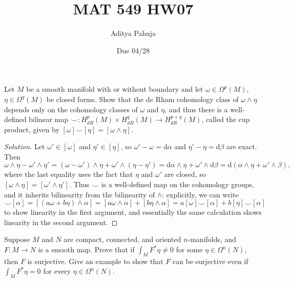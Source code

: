 \documentclass[10pt]{article}
\title{MAT 549 HW07}
\author{\large Aditya Pahuja}
\date{\large Due 04/28}
\newcommand{\dd}{\mathrm{d}}
\newenvironment{soln}{\begin{proof}[Solution]}{\end{proof}}
\begin{document}
\maketitle

\begin{problem}
    [17-1]
    Let $M$ be a smooth manifold with or without boundary
    and let $\omega\in\Omega^p(M)$, $\eta\in\Omega^q(M)$
    be closed forms. Show that the de Rham cohomology class
    of $\omega\wedge\eta$ depends only on
    the cohomology classes of $\omega$ and $\eta$,
    and thus there is a well-defined bilinear map
    $\smile\colon H^p_{dR}(M)\times H^q_{dR}(M)\to H^{p+q}_{dR}(M)$,
    called the cup product, given by
    $[\omega]\smile[\eta] = [\omega\wedge\eta]$.
\end{problem}

\begin{soln}
    Let $\omega'\in[\omega]$ and $\eta'\in[\eta]$,
    so $\omega' - \omega = \dd\alpha$ and $\eta' - \eta = \dd\beta$ are exact.
    Then
    \begin{equation*}
	\omega\wedge\eta - \omega'\wedge\eta'
	= (\omega - \omega')\wedge\eta
	+ \omega'\wedge(\eta - \eta')
	= \dd\alpha\wedge\eta + \omega'\wedge\dd\beta
	= \dd(\alpha\wedge\eta + \omega'\wedge\beta),
    \end{equation*}
    where the last equality uses the fact that
    $\eta$ and $\omega'$ are closed, so
    $[\omega\wedge\eta] = [\omega'\wedge\eta']$.
    Thus $\smile$ is a well-defined map on the cohomology groups,
    and it inherits bilinearity from the bilinearity of $\wedge$:
    explicitly, we can write
    \begin{equation*}
	[a\omega + b\eta]\smile[\alpha] = [(a\omega + b\eta)\wedge\alpha]
	= [a\omega\wedge\alpha] + [b\eta\wedge\alpha]
	= a[\omega]\smile[\alpha] + b[\eta]\smile[\alpha]
    \end{equation*}
    to show linearity in the first argument,
    and essentially the same calculation
    shows linearity in the second argument.
\end{soln}

\begin{problem}
    [17-12]
    Suppose $M$ and $N$ are compact, connected, and oriented $n$-manifolds,
    and $F\colon M\to N$ is a smooth map.
    Prove that if $\int_M F^*\eta\ne 0$ for some $\eta\in\Omega^n(N)$,
    then $F$ is surjective. Give an example to show that
    $F$ can be surjective even if $\int_M F^*\eta = 0$
    for every $\eta\in\Omega^n(N)$.
\end{problem}
\end{document}
